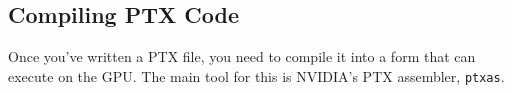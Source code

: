 \subsection{Compiling PTX Code}

Once you've written a PTX file, you need to compile it into a form that can execute on the GPU. The main tool for this is NVIDIA's PTX assembler, \texttt{ptxas}.

